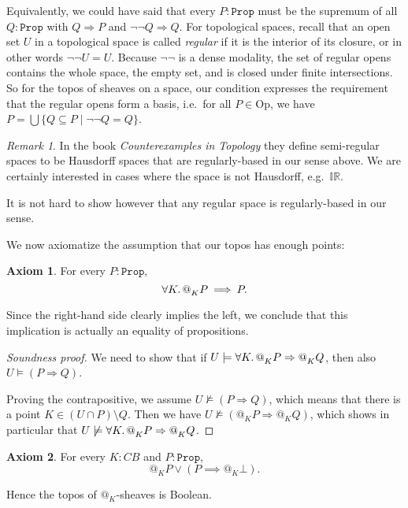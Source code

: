 \documentclass[11pt, oneside, article]{memoir}
\makeatletter
\theoremstyle{plain}
\theoremstyle{definition}
\newtheorem{axiom}{Axiom}
\theoremstyle{remark}
\newtheorem{remark}[theorem]{Remark}
\newenvironment{soundproof}{\begin{proof}[Soundness proof]}{\end{proof}}
\renewcommand{\ss}{\subseteq}
\newcommand{\const}[1]{\mathtt{#1}}
\newcommand{\Set}[1]{\mathrm{#1}}
\newcommand{\IR}{\mathbb{IR}} %
\newcommand{\Prop}{\const{Prop}}
\newcommand{\Op}{\Set{Op}}
\newcommand{\BaseSpace}{B}
\newcommand{\CB}{C\BaseSpace}
\newcommand{\AtSymbol}{{@}}
\newcommand{\At}[2][]{\AtSymbol^{#1}_{#2}}
\newcommand{\imp}{\Rightarrow}
\makeatother
\begin{document}
Equivalently, we could have said that every $P:\Prop$ must be the supremum of all $Q:\Prop$ with $Q\imp P$ and $\neg\neg Q\imp Q$. For topological spaces, recall that an open set $U$ in a topological space is called \emph{regular} if it is the interior of its closure, or in other words $\neg\neg U=U$. Because $\neg\neg$ is a dense modality, the set of regular opens contains the whole space, the empty set, and is closed under finite intersections. So for the topos of sheaves on a space, our condition expresses the requirement that the regular opens form a basis, i.e.\ for all $P\in\Op$, we have $P=\bigcup {\{Q\ss P\mid \neg\neg Q=Q\}}$.

\begin{remark}
In the book \emph{Counterexamples in Topology} they define semi-regular spaces to be Hausdorff spaces that are regularly-based in our sense above. We are certainly interested in cases where the space is not Hausdorff, e.g.\ $\IR$.

It is not hard to show however that any regular space is regularly-based in our sense. 
\end{remark}

We now axiomatize the assumption that our topos has enough points:

\begin{axiom}\label{ax.enough_points}
For every $P:\Prop$,
\[
	\forall K\ldotp \At{K} P \: \Longrightarrow \: P.
\]
\end{axiom}

Since the right-hand side clearly implies the left, we conclude that this implication is actually an equality of propositions.

\begin{soundproof}
	We need to show that if $U \models \forall K\ldotp \At{K} P \imp \At{K} Q$, then also $U \models (P \imp Q)$.

	Proving the contrapositive, we assume $U \not\models (P \imp Q)$, which means that there is a point $K \in (U\cap P)\setminus Q$. Then we have $U \not\models (\At{K} P \imp \At{K} Q)$, which shows in particular that $U\not\models \forall K\ldotp \At{K} P \imp \At{K} Q$.
\end{soundproof}


\begin{axiom}\label{ax.atBoolean}
	For every $K : \CB$ and $P : \Prop$,
\[
	\At{K} P \lor ( P \implies \At{K} \bot).
\]
\end{axiom}

Hence the topos of $\At{K}$-sheaves is Boolean.
\end{document}
